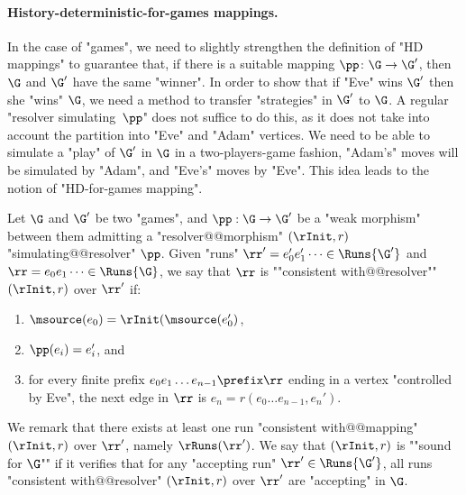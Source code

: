 \documentclass[10pt,a4paper]{amsart}
\begin{document}
\paragraph*{History-deterministic-for-games mappings.}

In the case of "games", we need to slightly strengthen the definition of "HD mappings" to guarantee that, if there is a suitable mapping $\pp\colon\G \to \G'$, then $\G$ and $\G'$ have the same "winner".
In order to show that if "Eve" wins $\G'$ then she "wins" $\G$, we need a method to transfer "strategies" in $\G'$ to $\G$. A regular "resolver simulating~$\pp$" does not suffice to do this, as it does not take into account the partition into "Eve" and "Adam" vertices. 
We need to be able to simulate a "play" of $\G'$ in $\G$ in a two-players-game fashion, "Adam's" moves will be simulated by "Adam", and "Eve's" moves by "Eve". This idea leads to the notion of "HD-for-games mapping".



Let $\G$ and $\G'$ be two "games", and $\pp:\G \to \G'$ be a "weak morphism" between them admitting a "resolver@@morphism" $(\rInit, r)$ "simulating@@resolver" $\pp$. 
\AP Given "runs" $\rr' = e_0'e_1'\dots \in \Runs{\G'}$ and $\rr = e_0e_1\dots \in \Runs{\G}$, we say that $\rr$ is ""consistent with@@resolver"" $(\rInit, r)$ over $\rr'$ if:
\begin{enumerate}
	\item $\msource(e_0) = \rInit(\msource(e_0')$,
	\item $\pp(e_i) = e_i'$, and %
	\item for every finite prefix $e_0e_1\dots e_{n-1} \prefix \rr$ ending in a vertex "controlled by Eve", the next edge in $\rr$ is $e_n = r(e_0\dots e_{n-1}, e_n')$.
\end{enumerate}  
We remark that there exists at least one run "consistent with@@mapping" $(\rInit, r)$ over $\rr'$, namely $\rRuns(\rr')$.
\AP We say that $(\rInit, r)$ is ""sound for $\G$"" if it verifies that for any "accepting run" $\rr'\in \Runs{\G'}$, all runs "consistent with@@resolver" $(\rInit, r)$ over $\rr'$ are "accepting" in $\G$. 
\end{document}
